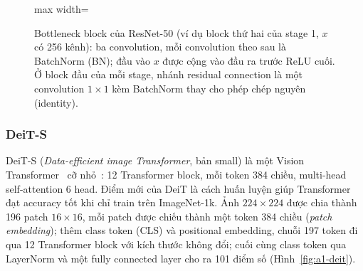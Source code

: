 \documentclass[a4paper,12pt]{article}
\begin{document}
\begin{figure}[!htb]
    \centering
    \begin{adjustbox}{max width=\linewidth}
    \end{adjustbox}
    \caption{Bottleneck block của ResNet-50 (ví dụ block thứ hai của stage 1, \(x\) có 256 kênh): ba convolution, mỗi convolution theo sau là BatchNorm (BN); đầu vào \(x\) được cộng vào đầu ra trước ReLU cuối. Ở block đầu của mỗi stage, nhánh residual connection là một convolution \(1{\times}1\) kèm BatchNorm thay cho phép chép nguyên (identity).}
    \label{fig:a1-block}
\end{figure}

\FloatBarrier

\subsubsection{DeiT-S}\label{sec:a1-deit}
DeiT-S (\emph{Data-efficient image Transformer}, bản small) là một Vision Transformer~\cite{dosovitskiy2021vit} cỡ nhỏ~\cite{touvron2021deit}: 12 Transformer block, mỗi token 384 chiều, multi-head self-attention 6 head. Điểm mới của DeiT là cách huấn luyện giúp Transformer đạt accuracy tốt khi chỉ train trên ImageNet-1k. Ảnh \(224\times224\) được chia thành 196 patch \(16\times16\), mỗi patch được chiếu thành một token 384 chiều (\emph{patch embedding}); thêm class token (CLS) và positional embedding, chuỗi 197 token đi qua 12 Transformer block với kích thước không đổi; cuối cùng class token qua LayerNorm và một fully connected layer cho ra 101 điểm số (Hình~\ref{fig:a1-deit}).
\end{document}
